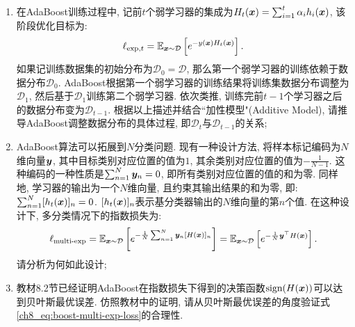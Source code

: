 \documentclass[answers]{exam}  %
\begin{document}
\begin{questions}
\begin{enumerate}
    \item  在AdaBoost训练过程中, 记前$t$个弱学习器的集成为$H_t({\boldsymbol{x}}) = \sum_{i=1}^t \alpha_i h_i({\boldsymbol{x}})$, 该阶段优化目标为: 
    \begin{equation}
        \ell_{\text{exp},t} = \mathbb{E}_{{\boldsymbol{x}} \sim \mathcal{D}}\left[ e^{-y({\boldsymbol{x}})H_t({\boldsymbol{x}})} \right]. \label{ch8_eq:boost-exp-loss}
    \end{equation}
    如果记训练数据集的初始分布为$\mathcal{D}_0=\mathcal{D}$, 那么第一个弱学习器的训练依赖于数据分布$\mathcal{D}_0$. AdaBoost根据第一个弱学习器的训练结果将训练集数据分布调整为$\mathcal{D}_1$, 然后基于$\mathcal{D}_1$训练第二个弱学习器. 依次类推, 训练完前$t-1$个学习器之后的数据分布变为$\mathcal{D}_{t-1}$. 根据以上描述并结合``加性模型"(Additive Model), 请推导AdaBoost调整数据分布的具体过程, 即$\mathcal{D}_t$与$\mathcal{D}_{t-1}$的关系; 
    \item AdaBoost算法可以拓展到$N$分类问题. 现有一种设计方法, 将样本标记编码为$N$维向量$\boldsymbol{y}$, 其中目标类别对应位置的值为$1$, 其余类别对应位置的值为$-\frac{1}{N-1}$. 这种编码的一种性质是$\sum_{n=1}^N \boldsymbol{y}_n = 0$, 即所有类别对应位置的值的和为零. 同样地, 学习器的输出为一个$N$维向量, 且约束其输出结果的和为零, 即: $\sum_{n=1}^N [h_t({\boldsymbol{x}})]_n = 0$. $[h_t({\boldsymbol{x}})]_{n}$表示基分类器输出的$N$维向量的第$n$个值. 在这种设计下, 多分类情况下的指数损失为: 
    \begin{equation}
        \ell_{\text{multi-exp}} = \mathbb{E}_{{\boldsymbol{x}} \sim \mathcal{D}}\left[  e^{-\frac{1}{N}\sum_{n=1}^N \boldsymbol{y}_n [H({\boldsymbol{x}})]_n} \right] = \mathbb{E}_{{\boldsymbol{x}} \sim \mathcal{D}}\left[  e^{- \frac{1}{N} \boldsymbol{y}^\top H({\boldsymbol{x}})} \right]. \label{ch8_eq:boost-multi-exp-loss}
    \end{equation}
    请分析为何如此设计;
    \item 教材8.2节已经证明AdaBoost在指数损失下得到的决策函数$\text{sign}(H({\boldsymbol{x}}))$可以达到贝叶斯最优误差. 仿照教材中的证明, 请从贝叶斯最优误差的角度验证式\eqref{ch8_eq:boost-multi-exp-loss}的合理性.
\end{enumerate}


\end{questions}
\end{document}
